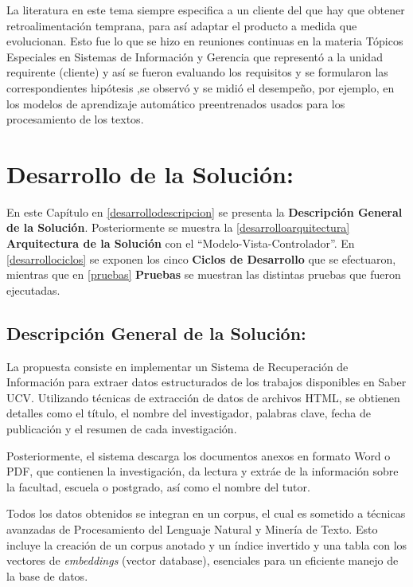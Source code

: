 \documentclass[
  10,
  openany]{book}
\begin{document}
La literatura en este tema siempre especifica a un cliente del que hay que obtener retroalimentación temprana, para así adaptar el producto a medida que evolucionan. Esto fue lo que se hizo en reuniones continuas en la materia Tópicos Especiales en Sistemas de Información y Gerencia que representó a la unidad requirente (cliente) y así se fueron evaluando los requisitos y se formularon las correspondientes hipótesis ,se observó y se midió el desempeño, por ejemplo, en los modelos de aprendizaje automático preentrenados usados para los procesamiento de los textos.

\hypertarget{desarrollo}{%
\chapter{Desarrollo de la Solución:}\label{desarrollo}}

En este Capítulo en \ref{desarrollodescripcion} se presenta la \textbf{Descripción General de la Solución}. Posteriormente se muestra la \ref{desarrolloarquitectura} \textbf{Arquitectura de la Solución} con el ``Modelo-Vista-Controlador''. En \ref{desarrollociclos} se exponen los cinco \textbf{Ciclos de Desarrollo} que se efectuaron, mientras que en \ref{pruebas} \textbf{Pruebas} se muestran las distintas pruebas que fueron ejecutadas.

\hypertarget{desarollodescripcion}{%
\section{Descripción General de la Solución:}\label{desarollodescripcion}}

La propuesta consiste en implementar un Sistema de Recuperación de Información para extraer datos estructurados de los trabajos disponibles en Saber UCV. Utilizando técnicas de extracción de datos de archivos HTML, se obtienen detalles como el título, el nombre del investigador, palabras clave, fecha de publicación y el resumen de cada investigación.

Posteriormente, el sistema descarga los documentos anexos en formato Word o PDF, que contienen la investigación, da lectura y extráe de la información sobre la facultad, escuela o postgrado, así como el nombre del tutor.

Todos los datos obtenidos se integran en un corpus, el cual es sometido a técnicas avanzadas de Procesamiento del Lenguaje Natural y Minería de Texto. Esto incluye la creación de un corpus anotado y un índice invertido y una tabla con los vectores de \emph{embeddings} (vector database), esenciales para un eficiente manejo de la base de datos.
\end{document}
